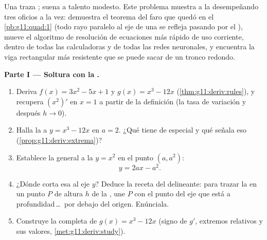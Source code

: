 \begin{problem}
\label{pb:g11:deriv:1}
Una  traza ; suena a talento modesto. Este problema
muestra a la  desempeñando tres oficios a la vez: demuestra el
teorema del faro que quedó  en el \cref{pb:g11:quad:1} (todo rayo
paralelo al eje de una  se refleja pasando por el ), mueve el
algoritmo de resolución de ecuaciones más rápido de uso corriente, dentro
de todas las calculadoras y de todas las redes neuronales, y encuentra la
viga rectangular más resistente que se puede sacar de un tronco redondo.

\medskip
\noindent\textbf{Parte I --- Soltura con la .}
\begin{enumerate}
  \item Deriva $f(x) = 3x^2 - 5x + 1$ y $g(x) = x^3 - 12x$
        (\cref{thm:g11:deriv:rules}), y recupera $\left(x^2\right)'$ en
        $x = 1$ a partir de la definición (la tasa de variación y después
        $h \to 0$).
  \item Halla la  a $y = x^3 - 12x$ en $a = 2$. ¿Qué tiene de
        especial y qué señala eso (\cref{prop:g11:deriv:extrema})?
  \item Establece la  general a la  $y = x^2$ en el punto
        $(a, a^2)$:
        \[
        y = 2ax - a^2 .
        \]
  \item ¿Dónde corta esa  al eje $y$? Deduce la receta del
        delineante: para trazar la  en un punto $P$ de altura $h$
        de la , une $P$ con el punto del eje que está a
        profundidad\,\dots\ por debajo del origen. Enúnciala.
  \item Construye la  completa de $g(x) = x^3 - 12x$
        (signo de $g'$, extremos relativos y sus valores,
        \cref{met:g11:deriv:study}).
\end{enumerate}


\end{problem}
